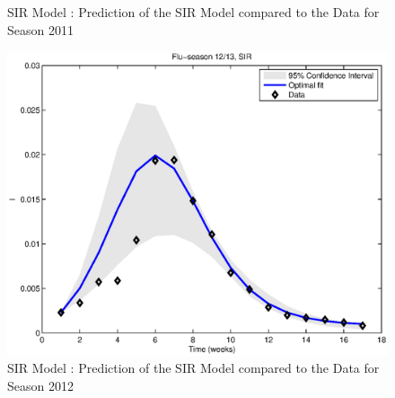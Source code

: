 \documentclass[11pt, a4paper]{article}
\begin{document}
\begin{figure}[h]
    \caption{SIR Model : Prediction of the SIR Model compared to the Data for Season 2011}
    \label{fig:sir_pred2}
    \includegraphics[height = 0.25\textheight]{figures/SIR_prediction_season3.eps}
    \caption{SIR Model : Prediction of the SIR Model compared to the Data for Season 2012}
    \label{fig:sir_pred3}
\end{figure}
\end{document}
